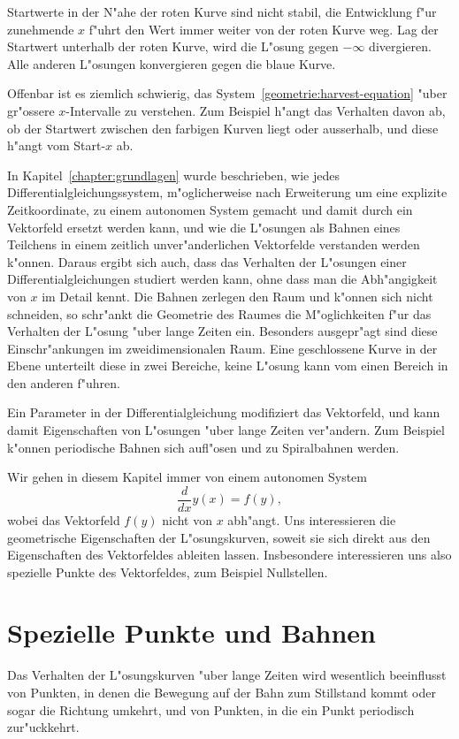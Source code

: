 Startwerte in der N"ahe der roten Kurve sind nicht stabil,
die Entwicklung f"ur zunehmende $x$ f"uhrt den Wert immer weiter von
der roten Kurve weg.
Lag der Startwert unterhalb der roten Kurve, wird die L"osung gegen
$-\infty$ divergieren.
Alle anderen L"osungen konvergieren gegen die blaue Kurve.

Offenbar ist es ziemlich schwierig, das
System~\eqref{geometrie:harvest-equation} "uber gr"ossere $x$-Intervalle
zu verstehen. 
Zum Beispiel h"angt das Verhalten davon ab, ob der Startwert zwischen den
farbigen Kurven liegt oder ausserhalb, und diese h"angt vom Start-$x$ ab.

In Kapitel~\ref{chapter:grundlagen} wurde beschrieben, wie jedes
Differentialgleichungssystem, m"oglicherweise nach Erweiterung um eine
explizite Zeitkoordinate, zu einem autonomen System gemacht und damit
durch ein Vektorfeld ersetzt werden kann,
und wie die L"osungen als Bahnen eines Teilchens in einem zeitlich
unver"anderlichen Vektorfelde verstanden werden k"onnen.
Daraus ergibt sich auch, dass das Verhalten der L"osungen einer
Differentialgleichungen studiert werden kann, ohne dass man
die Abh"angigkeit von $x$ im Detail kennt.
Die Bahnen zerlegen den Raum und k"onnen sich nicht schneiden,
so schr"ankt die Geometrie des Raumes die M"oglichkeiten f"ur das
Verhalten der L"osung "uber lange Zeiten ein.
Besonders ausgepr"agt sind diese Einschr"ankungen im zweidimensionalen
Raum.
Eine geschlossene Kurve in der Ebene unterteilt diese in zwei Bereiche,
keine L"osung kann vom einen Bereich in den anderen f"uhren.

Ein Parameter in der Differentialgleichung modifiziert das Vektorfeld,
und kann damit Eigenschaften von L"osungen "uber lange Zeiten ver"andern.
Zum Beispiel k"onnen periodische Bahnen sich aufl"osen und zu Spiralbahnen
werden.

Wir gehen in diesem Kapitel immer von einem autonomen System
\[
\frac{d}{dx}y(x)=f(y),
\]
wobei das Vektorfeld $f(y)$ nicht von $x$ abh"angt.
Uns interessieren die geometrische Eigenschaften der L"osungskurven, 
soweit sie sich direkt aus den Eigenschaften des Vektorfeldes ableiten
lassen.
Insbesondere interessieren uns also spezielle Punkte des Vektorfeldes,
zum Beispiel Nullstellen.


%
%
\section{Spezielle Punkte und Bahnen}
Das Verhalten der L"osungskurven "uber lange Zeiten wird wesentlich
beeinflusst von Punkten, in denen die Bewegung auf der Bahn
zum Stillstand kommt oder sogar die Richtung umkehrt, und von Punkten,
in die ein Punkt periodisch zur"uckkehrt.

